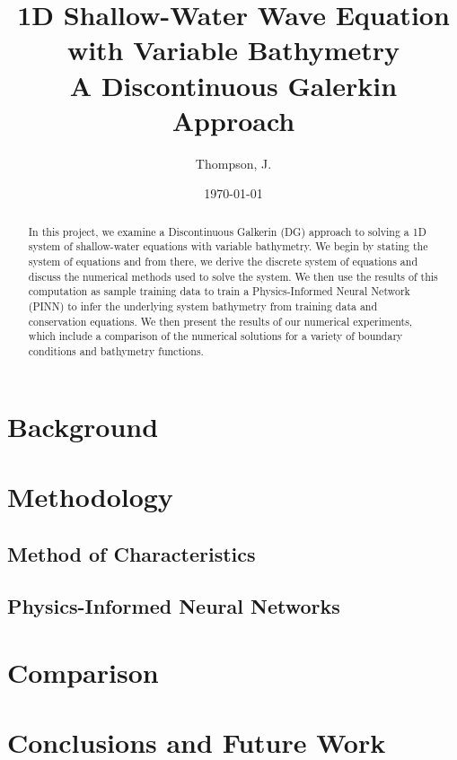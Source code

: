 \documentclass[letterpaper,11pt]{article}
\begin{document}
    \title{%
        1D Shallow-Water Wave Equation with Variable Bathymetry\\
        \large A Discontinuous Galerkin Approach
    }
    \author{%
        Thompson, J.
    }
    \date{\today}
    \maketitle

    \begin{abstract}
        In this project, we examine a Discontinuous Galkerin (DG) approach to solving a 1D system of shallow-water
        equations with variable bathymetry. We begin by stating the system of equations and from there, we derive the 
        discrete system of equations and discuss the numerical methods used to solve the system. We then use the results
        of this computation as sample training data to train a Physics-Informed Neural Network (PINN) to infer the
        underlying system bathymetry from training data and conservation equations. We then present the results of our 
        numerical experiments, which include a comparison of the numerical solutions for a variety of boundary 
        conditions and bathymetry functions.
    \end{abstract}

    \section{Background}\label{sec:background}

    

    \section{Methodology}\label{sec:proposed-methodology}

    \subsection{Method of Characteristics}\label{subset:moc-methodology}

    

    \subsection{Physics-Informed Neural Networks}\label{subsec:pinn-methodology}

    \section{Comparison}\label{sec:comparison}

    \section{Conclusions and Future Work}\label{sec:conclusion}

    \pagebreak

    
    

    \pagebreak
    \appendix
    
\end{document}
